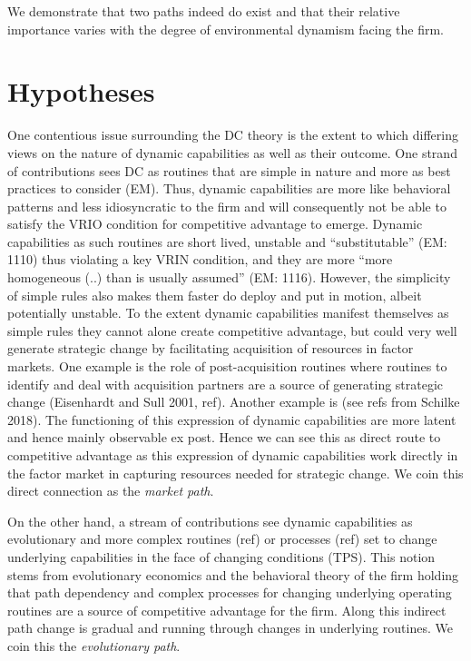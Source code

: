 \documentclass[review,fleqn]{elsarticle}\usepackage[]{graphicx}\usepackage[]{color}
\begin{document}
We demonstrate that two paths indeed do exist and that their relative importance varies
with the degree of environmental dynamism facing the firm.

\section{Hypotheses}\label{sec:hyp}



One contentious issue surrounding the DC theory is the extent to which differing views on
the nature of dynamic capabilities \citep{Peteraf2013} as well as their outcome. One
strand of contributions sees DC as routines that are simple in nature and more as best
practices to consider (EM). Thus, dynamic capabilities are more like behavioral patterns
and less idiosyncratic to the firm and will consequently not be able to satisfy the VRIO
condition for competitive advantage to emerge. Dynamic capabilities as such routines are
short lived, unstable and “substitutable” (EM: 1110) thus violating a key VRIN condition,
and they are more “more homogeneous (..) than is usually assumed” (EM: 1116). However, the
simplicity of simple rules also makes them faster do deploy and put in motion, albeit
potentially unstable. To the extent dynamic capabilities manifest themselves as simple
rules they cannot alone create competitive advantage, but could very well generate
strategic change by facilitating acquisition of resources in factor markets. One example
is the role of post-acquisition routines where routines to identify and deal with
acquisition partners are a source of generating strategic change (Eisenhardt and Sull
2001, ref). Another example is (see refs from Schilke 2018). The functioning of this
expression of dynamic capabilities are more latent and hence mainly observable ex
post. Hence we can see this as direct route to competitive advantage as this expression of
dynamic capabilities work directly in the factor market in capturing resources
needed for strategic change. We coin this direct connection as the \emph{market path}.

On the other hand, a stream of contributions see dynamic capabilities as evolutionary and
more complex routines (ref) or processes (ref) set to change underlying capabilities in
the face of changing conditions (TPS). This notion stems from evolutionary economics
\citep{Winter2003,Nelson1982} and the behavioral theory of the firm \citep{Cyert1963}
holding that path dependency and complex processes for changing underlying operating
routines are a source of competitive advantage for the firm. Along this indirect path
change is gradual and running through changes in underlying routines. We coin this the
\emph{evolutionary path}.
\end{document}
